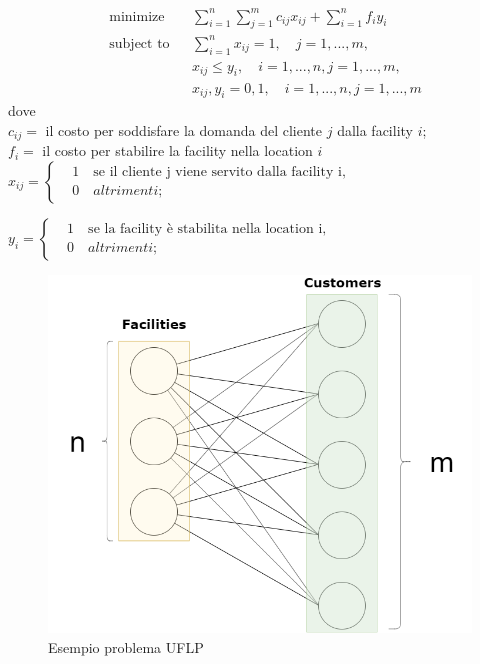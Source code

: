 \documentclass[a4paper,12pt,titlepage,oneside]{article}
\begin{document}
\begin{equation*}
\begin{aligned}
& \underset{}{\text{minimize}}
& & \sum_{i=1}^{n} \sum_{j=1}^{m}c_{ij}x_{ij} + \sum_{i=1}^{n}f_{i}y_{i} \\
& \text{subject to}
& & \sum_{i=1}^{n}x_{ij}=1, \quad j=1,...,m, \\
& & & x_{ij}\leq y_{i}, \quad i=1,...,n, j=1,...,m,\\
& & &  x_{ij},y_i=0,1,\quad i=1,...,n, j=1,...,m
\end{aligned}
\end{equation*}
dove \\
$c_{ij} =$ il costo per soddisfare la domanda del cliente $j$ dalla facility $i$; \\
$f_{i} =$ il costo per stabilire la facility nella location $i$ \\

$x_{ij}=\left\{\begin{aligned}
 & 1 \quad \text{se il cliente j viene servito dalla facility i},\\ 
 & 0 \quad altrimenti;
\end{aligned}\right.$

$y_{i}=\left\{\begin{aligned}
 & 1 \quad \text{se la facility è stabilita nella location i},\\ 
 & 0 \quad altrimenti;
\end{aligned}\right.$

\begin{figure}
  \centering
  \includegraphics[scale=.3]{UFLP_Sample.png}
  \caption{Esempio problema UFLP}
\end{figure}
\end{document}
